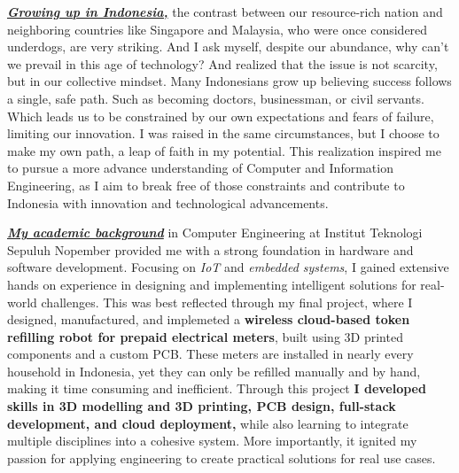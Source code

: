 \underline{\textit{\textbf{Growing up in Indonesia,}}} the contrast between our resource-rich nation and neighboring countries 
like Singapore and Malaysia, 
who were once considered underdogs, are very striking. And I ask myself, despite our abundance, why can't we prevail in this
age of technology? And realized that the issue is not scarcity, but in our collective mindset. Many Indonesians grow up believing
success follows a single, safe path. Such as becoming doctors, businessman, or civil servants. Which leads us to be constrained
by our own expectations and fears of failure, limiting our innovation. I was raised in the same circumstances, but I choose to
make my own path, a leap of faith in my potential. This realization inspired me to pursue a more advance understanding of Computer and 
Information Engineering, as I aim to break free of those constraints and contribute to Indonesia with innovation and technological advancements.

\underline{\textit{\textbf{My academic background}}} in Computer Engineering at Institut Teknologi Sepuluh Nopember provided
me with a strong foundation in hardware and software development. Focusing on \textit{IoT} and \textit{embedded systems}, I gained
extensive hands on experience in designing and implementing intelligent solutions for real-world challenges. This was best reflected through 
my final project, where I designed, manufactured, and implemeted a \textbf{wireless cloud-based token refilling robot for prepaid electrical meters}, 
built using 3D printed components and a custom PCB. These meters are installed in nearly every household in Indonesia,
yet they can only be refilled manually and by hand, making it time consuming and inefficient. Through this project \textbf{I developed skills in
3D modelling and 3D printing, PCB design, full-stack development, and cloud deployment,} while also learning to integrate multiple disciplines into
a cohesive system. More importantly, it ignited my passion for applying engineering to create practical solutions for real use cases.